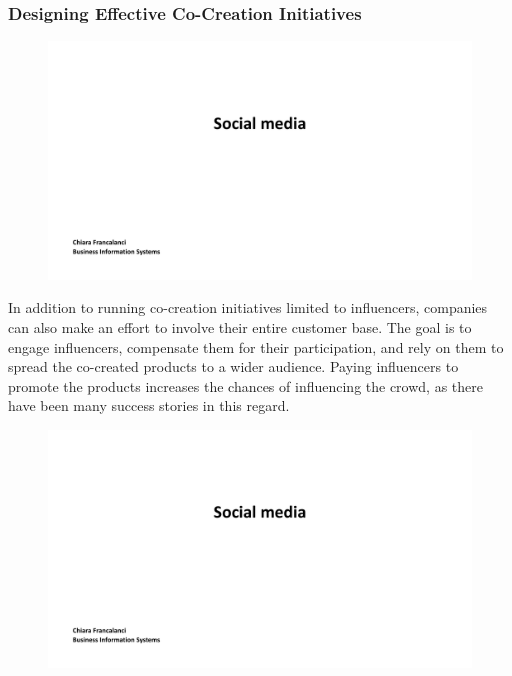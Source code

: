 \subsubsection{Designing Effective Co-Creation
  Initiatives}\label{designing-effective-co-creation-initiatives}

\begin{figure}[!h]
  \centering
  \includegraphics[page=15, trim = 1.5cm 6cm 3cm 4cm, clip, width=\imagewidth]{images/04 - Social_Media.pdf}
\end{figure}

In addition to running co-creation initiatives limited to influencers,
companies can also make an effort to involve their entire customer base.
The goal is to engage influencers, compensate them for their
participation, and rely on them to spread the co-created products to a
wider audience. Paying influencers to promote the products increases the
chances of influencing the crowd, as there have been many success
stories in this regard.

\begin{figure}[!h]
  \centering
  \includegraphics[page=16, trim = 0cm 5cm 3cm 5cm, clip, width=\imagewidth]{images/04 - Social_Media.pdf}
\end{figure}

